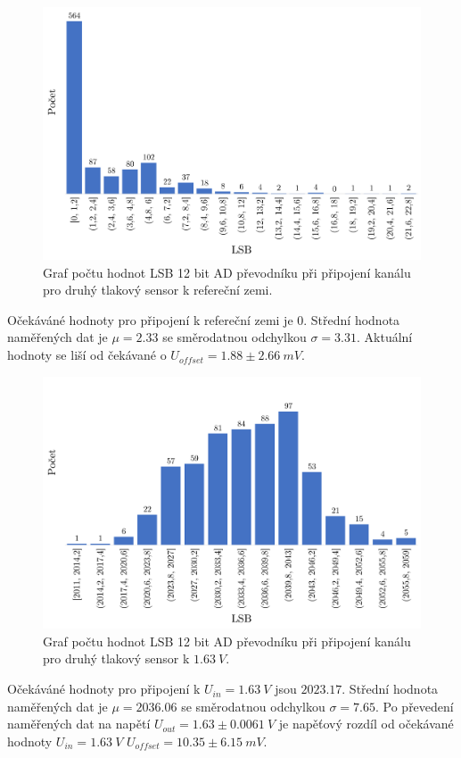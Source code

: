 \begin{figure}[H]
    \caption{Graf počtu hodnot LSB 12 bit AD převodníku při připojení kanálu pro druhý tlakový sensor k refereční zemi.}
    \label{fig:hist_vacuum2_gnd}
    \includegraphics[width=1\textwidth]{graphs/vacuum2_gnd.png}

\end{figure}
Očekáváné hodnoty pro připojení k refereční zemi je 0. Střední hodnota naměřených dat je $\mu = 2.33$ se směrodatnou odchylkou $\sigma = 3.31$. Aktuální hodnoty se liší od čekávané o $U_{offset} = 1.88 \pm 2.66 \ mV$.

\begin{figure}[H]
    \caption{Graf počtu hodnot LSB 12 bit AD převodníku při připojení kanálu pro druhý tlakový sensor k $1.63 \ V$.}
    \label{fig:hist_vacuum2_1_6}
    \includegraphics[width=1\textwidth]{graphs/vacuum2_16.png}

\end{figure}
Očekáváné hodnoty pro připojení k $U_{in} = 1.63 \ V$ jsou $2023.17$. Střední hodnota naměřených dat je $\mu = 2036.06$ se směrodatnou odchylkou $\sigma = 7.65$. Po převedení naměřených dat na napětí $U_{out} = 1.63 \pm 0.0061 \ V$ je napěťový rozdíl od očekávané hodnoty $U_{in} = 1.63 \ V$
$U_{offset} = 10.35 \pm 6.15 \ mV$.

